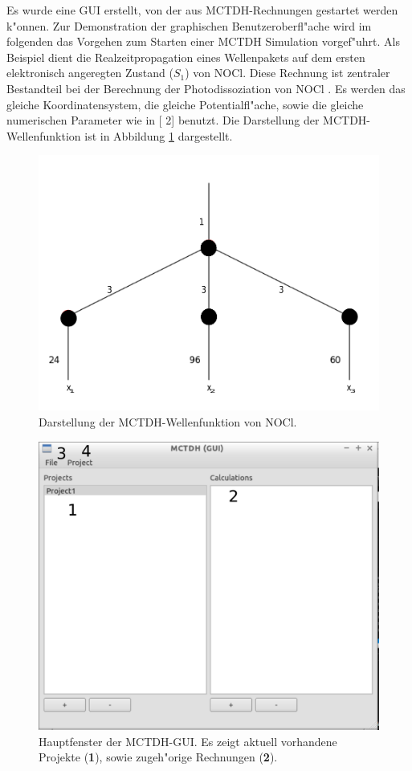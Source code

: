 Es wurde eine GUI erstellt, von der aus MCTDH-Rechnungen gestartet werden k"onnen. 
Zur Demonstration der graphischen Benutzeroberfl"ache wird im folgenden das Vorgehen zum Starten einer 
MCTDH Simulation vorgef"uhrt. Als Beispiel dient die Realzeitpro\-pagation eines Wellenpakets auf dem
ersten elektronisch angeregten Zustand ($S_1$) von NOCl. 
Diese Rechnung ist zentraler Bestandteil bei der Berechnung der Photodissoziation von NOCl \cite{MMC1}.
Es werden das gleiche Koordinatensystem, die gleiche Potentialfl"ache, sowie die gleiche numerischen Parameter wie in
[{\color{darkblue} 2}] benutzt.
Die Darstellung der MCTDH-Wellenfunktion ist in Abbildung \ref{fig:NOCl} dargestellt. 

\begin{figure}
    \centering
    \includegraphics[scale=0.5]{figures/NOCl}
    \caption{Darstellung der MCTDH-Wellenfunktion von NOCl.}\label{fig:NOCl}
\end{figure}

\begin{figure}
    \centering
    \includegraphics[scale=0.5]{figures/screenMain}
    \caption{Hauptfenster der MCTDH-GUI. Es zeigt aktuell vorhandene Projekte (\textbf{1}), sowie zugeh"orige Rechnungen (\textbf{2}).}\label{fig:workflow1}
\end{figure}

